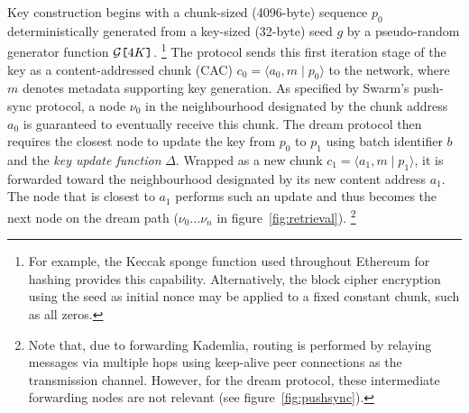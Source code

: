 \documentclass[singlecolumn]{acmart}
\newcommand{\node}{\nu}
\newcommand{\idx}[1]{\texttt{[}\/#1\/\texttt{]}}
\begin{document}
Key construction begins with a chunk-sized (4096-byte) sequence $p_0$ deterministically generated from a key-sized (32-byte) seed $g$ by a pseudo-random generator function $\mathcal{G}\idx{4K}$.%
%
\footnote{For example, the Keccak sponge function used throughout Ethereum for hashing provides this capability. Alternatively, the block cipher encryption using the seed as initial nonce may be applied to a fixed constant chunk, such as all zeros.}
%
The protocol sends this first iteration stage of the key as a content-addressed chunk (CAC) $c_0 = \langle a_0, m \mid  p_0\rangle$ to the network, where $m$ denotes metadata supporting key generation. As specified by Swarm's push-sync protocol, a node $\node_0$ in the neighbourhood designated by the chunk address $a_0$ is guaranteed to eventually receive this chunk. The dream protocol then requires the closest node to update the key from $p_0$ to $p_1$ using batch identifier $b$ and the \emph{key update function} $\Delta$. Wrapped as a new chunk $c_1 =\langle a_1, m \mid p_1\rangle$, it is forwarded toward the neighbourhood designated by its new content address $a_1$. The node that is closest to $a_1$ performs such an update and thus becomes the next node on the dream path ($\node_0\ldots\node_n$ in figure~\ref{fig:retrieval}).%
%
\footnote{Note that, due to forwarding Kademlia, routing is performed by relaying messages via multiple hops using keep-alive peer connections as the transmission channel. However, for the dream protocol, these intermediate forwarding nodes are not relevant (see figure~\ref{fig:pushsync}).}
%
%
\end{document}
